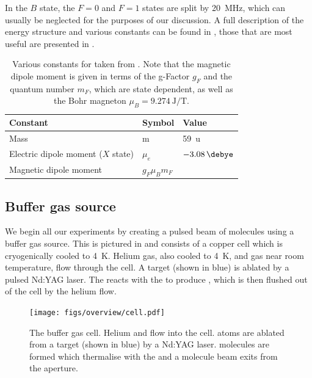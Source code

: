 In the $B$ state, the $F=0$ and $F=1$ states are split by \SI{20}{\mega\hertz},
which can usually be neglected for the purposes of our discussion. A full
description of the \CaF{} energy structure and various constants can be found
in , those that are most useful are presented in
.

\begin{table}
  \centering
\begin{tabular}{lll}
  \hline\hline
  Constant & Symbol & Value \\
  \hline
  Mass & m & \SI{59}{\amu}\\
  Electric dipole moment ($X$ state) & $\mu_e$ & $\SI{-3.08}{\debye}$\\
  Magnetic dipole moment & $g_F\mu_B m_F$ & \\
 \hline
\end{tabular}
\caption[\CaF{} constants]{
  Various constants for \CaF{} taken from . Note that
  the magnetic dipole moment is given in terms of the g-Factor $g_F$ and the
  quantum number $m_F$, which are state dependent, as well as the Bohr magneton
  $\mu_B = \SI{9.274}{\joule\per\tesla}$.
  }
  \label{overview:table:constants}
\end{table}

\subsection{Buffer gas source}

We begin all our experiments by creating a pulsed beam of \CaF{} molecules
using a buffer gas source. This is pictured in 
and consists of a copper cell which is cryogenically cooled to \SI{4}{\kelvin}.
%
Helium gas, also cooled to \SI{4}{\kelvin}, and \SFsix{} gas near room
temperature, flow through the cell. A \Ca{} target (shown in blue) is ablated
by a pulsed Nd:YAG laser. The \Ca{} reacts with the \SFsix{} to produce \CaF{}, which is
then flushed out of the cell by the helium flow.

\begin{figure}
  \centering
  \texttt{[image: figs/overview/cell.pdf]}
  \caption[The buffer gas cell]{
    The buffer gas cell. Helium and \SFsix flow into the cell. \Ca{}
  atoms are ablated from a target (shown in blue) by a Nd:YAG laser. \CaF{} molecules are
formed which thermalise with the \He{} and a molecule beam exits from the aperture.}
  \label{overview:fig:source}
\end{figure}

